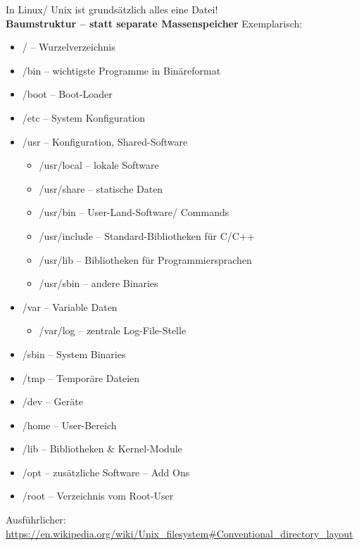 \documentclass[xcolor=dvipsnames,aspectratio=169]{beamer}
\begin{document}
\begin{frame}
In Linux/ Unix ist grundsätzlich alles eine Datei!\\
\textbf{Baumstruktur -- statt separate Massenspeicher}
Exemplarisch:
\begin{itemize}
	\item / -- Wurzelverzeichnis
	\item /bin -- wichtigste Programme in Binäreformat
	\item /boot -- Boot-Loader
	\item /etc -- System Konfiguration

	\item /usr -- Konfiguration, Shared-Software
	\begin{itemize}
		\item /usr/local -- lokale Software
		\item /usr/share -- statische Daten
		\item /usr/bin -- User-Land-Software/ Commands
		\item /usr/include -- Standard-Bibliotheken für C/C++
		\item /usr/lib -- Bibliotheken für Programmiersprachen
		\item /usr/sbin -- andere Binaries
	\end{itemize}

\end{itemize}
\end{frame}
\begin{frame}
\begin{itemize}
\item /var -- Variable Daten
	\begin{itemize}
		\item /var/log -- zentrale Log-File-Stelle
	\end{itemize}
	\item /sbin -- System Binaries
	\item /tmp -- Temporäre Dateien
	\item /dev -- Geräte
	\item /home -- User-Bereich
	\item /lib -- Bibliotheken \& Kernel-Module
	\item /opt -- zusätzliche Software -- Add Ons
	\item /root -- Verzeichnis vom Root-User
\end{itemize}
Ausführlicher: \url{https://en.wikipedia.org/wiki/Unix_filesystem\#Conventional_directory_layout}
\end{frame}
\end{document}
